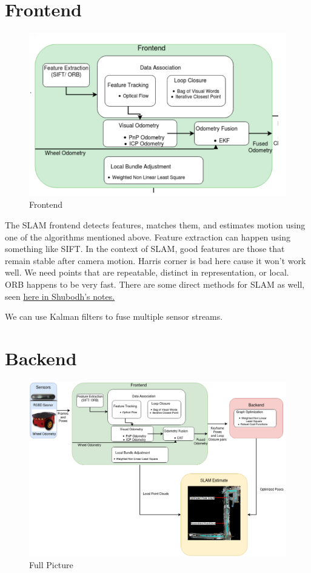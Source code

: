 \section{Frontend}

\begin{figure}[h]
    \centering
    \includegraphics[width=12cm]{img/frontend.png}
    \caption{Frontend}
    \label{fig:frontend}
\end{figure}

The SLAM frontend detects features, matches them, and estimates motion using one of the algorithms mentioned above. Feature extraction can happen using something like SIFT. In the context of SLAM, good features are those that remain stable after camera motion. Harris corner is bad here cause it won't work well. We need points that are repeatable, distinct in representation, or local. ORB happens to be very fast. There are some direct methods for SLAM as well, seen \href{https://www.notion.so/SLAM-Frontend-Visual-Odometry-bd7dbccb797f442f955f450044ee200f#5346a971d36a4ac386c772228c7fe3bd}{here in Shubodh's notes.}

We can use Kalman filters to fuse multiple sensor streams.

\section{Backend}

\begin{figure}[h]
    \centering
    \includegraphics[width=12cm]{img/backend.png}
    \caption{Full Picture}
    \label{fig:slam}
\end{figure}

